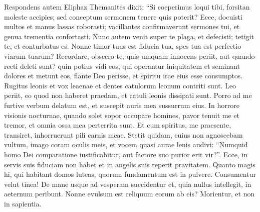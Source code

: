 \begin{biblechapter}  
\verse Respondens autem Eliphaz Themanites dixit: 
\verse “Si coeperimus loqui tibi, forsitan moleste accipies; sed conceptum sermonem tenere quis poterit? 
\verse Ecce, docuisti multos et manus lassas roborasti; 
\verse vacillantes confirmaverunt sermones tui, et genua trementia confortasti. 
\verse Nunc autem venit super te plaga, et defecisti; tetigit te, et conturbatus es. 
\verse Nonne timor tuus est fiducia tua, spes tua est perfectio viarum tuarum? 
\verse Recordare, obsecro te, quis umquam innocens periit, aut quando recti deleti sunt? 
\verse quin potius vidi eos, qui operantur iniquitatem et seminant dolores et metunt eos, 
\verse flante Deo perisse, et spiritu irae eius esse consumptos. 
\verse Rugitus leonis et vox leaenae et dentes catulorum leonum contriti sunt. 
\verse Leo periit, eo quod non haberet praedam, et catuli leonis dissipati sunt. 
\verse Porro ad me furtive verbum delatum est, et suscepit auris mea sussurrum eius. 
\verse In horrore visionis nocturnae, quando solet sopor occupare homines, 
\verse pavor tenuit me et tremor, et omnia ossa mea perterrita sunt. 
\verse Et cum spiritus, me praesente, transiret, inhorruerunt pili carnis meae. 
\verse Stetit quidam, cuius non agnoscebam vultum, imago coram oculis meis, et vocem quasi aurae lenis audivi: 
\verse “Numquid homo Dei comparatione iustificabitur, aut factore suo purior erit vir?”. 
\verse Ecce, in servis suis fiduciam non habet et in angelis suis reperit pravitatem. 
\verse Quanto magis hi, qui habitant domos luteas, quorum fundamentum est in pulvere. Consumentur velut tinea! 
\verse De mane usque ad vesperam succidentur et, quia nullus intellegit, in aeternum peribunt. 
\verse Nonne evulsum est reliquum eorum ab eis? Morientur, et non in sapientia. 
\end{biblechapter}

